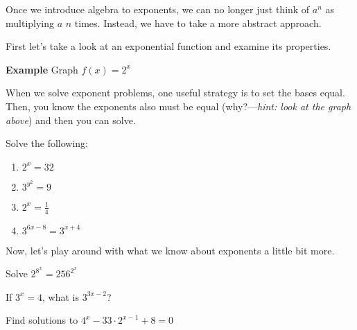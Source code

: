 	Once we introduce algebra to exponents, we can no longer just think of $a^{n}$ as multiplying $a$ $n$ times. Instead, we have to take a more abstract approach.\par
	
	First let's take a look at an exponential function and examine its properties.\par
	
	\textbf{Example} Graph $f(x) = 2^{x}$ \vspace{1.2in}
	
	When we solve exponent problems, one useful strategy is to set the bases equal. Then, you know the exponents also must be equal (why?---\textit{hint: look at the graph above}) and then you can solve.
	
	\begin{problem} Solve the following: \end{problem}
		\begin{multicols}{2}
			\begin{enumerate}
				\item $2^{x} = 32$
				\item $3^{y^{2}} = 9$
				\item $2^{x} = \frac{1}{4}$
				\item $3^{6x-8} = 3^{x+4}$
			\end{enumerate}
		\end{multicols}
	Now, let's play around with what we know about exponents a little bit more. \par
	
	\begin{problem} Solve $2^{8^{x}} = 256^{2^{x}}$ \end{problem} \vspace{.5in}
	
	\begin{problem} If $3^{x} = 4$, what is $3^{3x-2}$? \end{problem} \vspace{.5in}
	
	\begin{problem} Find solutions to $4^{x} - 33 \cdot 2^{x-1} + 8 = 0$ \end{problem} \vspace{1in}
	

